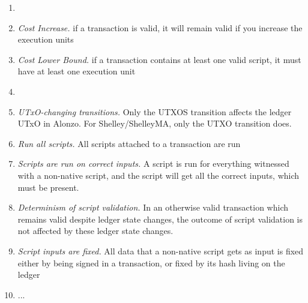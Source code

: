 \begin{enumerate}[label=P{\arabic*}:\ ]
\item
\item
  \emph{Cost Increase.} if a transaction is valid, it will remain valid if you increase the execution units
\item
  \emph{Cost Lower Bound.} if a transaction contains at least one valid script, it must have at least one execution unit
\item
\item \emph{UTxO-changing transitions.} Only the UTXOS transition affects the ledger UTxO in Alonzo.
For Shelley/ShelleyMA, only the UTXO transition does.
\item \emph{Run all scripts.} All scripts attached to a transaction are run
\item \emph{Scripts are run on correct inputs.}
  A script is run for everything witnessed with a non-native script, and the script will
get all the correct inputs, which must be present.
\item \emph{Determinism of script validation.} In an otherwise valid transaction which remains valid
  despite ledger state changes, the outcome
  of script validation is not affected by these ledger state changes.
\item \emph{Script inputs are fixed.} All data that a non-native script gets as input
is fixed either by being signed in a transaction, or fixed by its hash living on the ledger
\item
  ... 
\end{enumerate}
